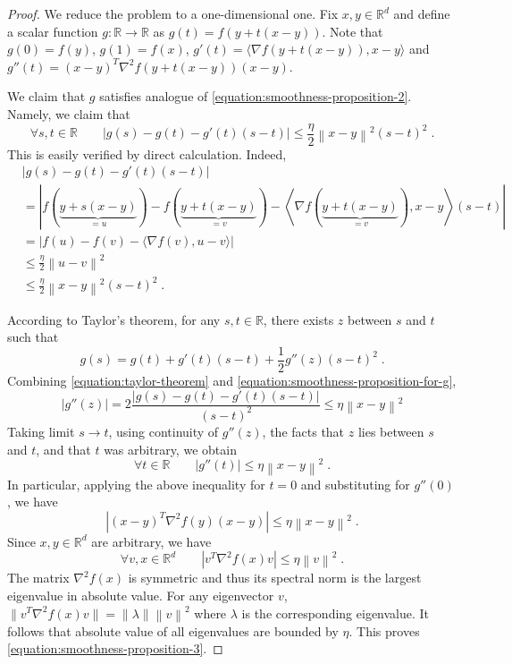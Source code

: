 \documentclass[12pt]{article}
\newcommand{\R}{\mathbb{R}}
\newcommand{\grad}{\nabla}
\newcommand{\norm}[1]{\left\|#1\right\|}
\begin{document}
\begin{proof}
We reduce the problem to a one-dimensional one. Fix $x,y \in \R^d$ and define a
scalar function $g:\R \to \R$ as $g(t) = f(y + t (x - y))$. Note that $g(0) =
f(y)$, $g(1) = f(x)$, $g'(t) = \langle \grad f(y + t(x - y)), x - y \rangle$
and $g''(t) = (x-y)^T \grad^2 f(y + t(x - y)) (x - y)$.

We claim that $g$ satisfies analogue of \eqref{equation:smoothness-proposition-2}.
Namely, we claim that
\begin{equation}
\label{equation:smoothness-proposition-for-g}
\forall s,t \in \R \qquad \left| g(s) - g(t) - g'(t) (s - t) \right| \le \frac{\eta}{2} \norm{x - y}^2 (s - t)^2 \; .
\end{equation}
This is easily verified by direct calculation. Indeed,
\begin{align*}
& \left| g(s) - g(t) - g'(t) (s - t) \right| \\
& = \left| f \left( \underbrace{y + s (x - y)}_{=u} \right) - f \left( \underbrace{y + t (x - y)}_{=v} \right) - \left\langle \grad f \left( \underbrace{y + t(x - y)}_{=v} \right), x - y \right\rangle (s - t) \right| \\
& = \left| f(u) - f(v) - \langle \grad f(v), u - v \rangle \right| \\
& \le \frac{\eta}{2} \norm{u - v}^2  \\
& \le \frac{\eta}{2} \norm{x - y}^2 (s - t)^2  \; .
\end{align*}

According to Taylor's theorem, for any $s,t \in \R$, there exists $z$ between $s$ and $t$
such that
\begin{equation}
\label{equation:taylor-theorem}
g(s) = g(t) + g'(t) (s - t) + \frac{1}{2} g''(z) (s - t)^2 \; .
\end{equation}
Combining \eqref{equation:taylor-theorem} and \eqref{equation:smoothness-proposition-for-g},
$$
|g''(z)| = 2 \frac{\left|g(s) - g(t) - g'(t) (s - t)\right|}{(s - t)^2} \le \eta \norm{x - y}^2
$$
Taking limit $s \to t$, using continuity of $g''(z)$, the facts that $z$ lies between $s$ and $t$,
and that $t$ was arbitrary, we obtain
$$
\forall t \in \R \qquad |g''(t)| \le \eta \norm{x - y}^2 \; .
$$
In particular, applying the above inequality for $t = 0$ and substituting for $g''(0)$, we have
$$
|(x-y)^T \grad^2 f(y) (x - y)| \le \eta \norm{x - y}^2 \; .
$$
Since $x,y \in \R^d$ are arbitrary, we have
$$
\forall v,x \in \R^d \qquad |v^T \grad^2 f(x) v| \le \eta \norm{v}^2 \; .
$$
The matrix $\grad^2 f(x)$ is symmetric and thus its spectral norm
is the largest eigenvalue in absolute value. For any eigenvector $v$,
$\|v^T \grad^2 f(x) v\| = \|\lambda\| \norm{v}^2$ where $\lambda$ is the corresponding eigenvalue.
It follows that absolute value of all eigenvalues are bounded by $\eta$.
This proves \eqref{equation:smoothness-proposition-3}.


\end{proof}
\end{document}
